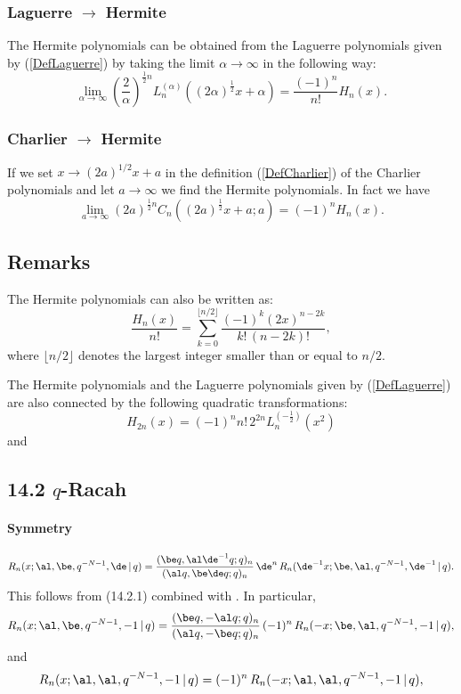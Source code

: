 \documentclass[envcountchap,graybox]{svmono}
\newcounter{rom}
\begin{document}
\subsubsection*{Laguerre $\rightarrow$ Hermite}
The Hermite polynomials can be obtained from the Laguerre polynomials given by
(\ref{DefLaguerre}) by taking the limit $\alpha\rightarrow\infty$ in the following way:
$$\lim_{\alpha\rightarrow\infty}
\left(\frac{2}{\alpha}\right)^{\frac{1}{2}n}
L_n^{(\alpha)}((2\alpha)^{\frac{1}{2}}x+\alpha)=\frac{(-1)^n}{n!}H_n(x).$$

\subsubsection*{Charlier $\rightarrow$ Hermite}
If we set $x\rightarrow (2a)^{1/2}x+a$ in the definition (\ref{DefCharlier})
of the Charlier polynomials and let $a\rightarrow\infty$ we find the Hermite
polynomials. In fact we have
$$\lim_{a\rightarrow\infty}
(2a)^{\frac{1}{2}n}C_n((2a)^{\frac{1}{2}}x+a;a)=(-1)^nH_n(x).$$

\subsection*{Remarks}
The Hermite polynomials can also be written as:
$$\frac{H_n(x)}{n!}=\sum_{k=0}^{\lfloor n/2\rfloor}
\frac{(-1)^k(2x)^{n-2k}}{k!\,(n-2k)!},$$
where $\lfloor n/2\rfloor$ denotes the largest integer smaller than or equal to $n/2$.

\noindent
The Hermite polynomials and the Laguerre polynomials given by (\ref{DefLaguerre}) are also
connected by the following quadratic transformations:
$$H_{2n}(x)=(-1)^nn!\,2^{2n}L_n^{(-\frac{1}{2})}(x^2)$$
and
\subsection*{14.2 $q$-Racah}
\label{sec14.2}
\paragraph{Symmetry}
\begin{equation}
R_n(x;\al,\be,q^{-N-1},\de\,|\, q)
=\frac{(\be q,\al\de^{-1}q;q)_n}{(\al q,\be\de q;q)_n}\,\de^n\,
R_n(\de^{-1}x;\be,\al,q^{-N-1},\de^{-1}\,|\, q).
\label{84}
\end{equation}
This follows from (14.2.1) combined with .
\sLP
In particular,
\begin{equation}
R_n(x;\al,\be,q^{-N-1},-1\,|\, q)
=\frac{(\be q,-\al q;q)_n}{(\al q,-\be q;q)_n}\,(-1)^n\,
R_n(-x;\be,\al,q^{-N-1},-1\,|\, q),
\label{85}
\end{equation}
and
\begin{equation}
R_n(x;\al,\al,q^{-N-1},-1\,|\, q)
=(-1)^n\,R_n(-x;\al,\al,q^{-N-1},-1\,|\, q),
\label{86}
\end{equation}
\end{document}
